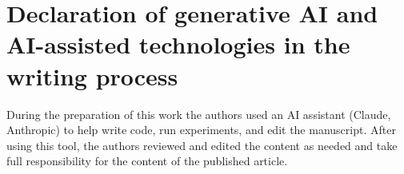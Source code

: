 \documentclass[preprint,12pt]{elsarticle}
\begin{document}
\section*{Declaration of generative AI and AI-assisted technologies in the writing process}
During the preparation of this work the authors used an AI assistant (Claude, Anthropic) to help write code, run experiments, and edit the manuscript. After using this tool, the authors reviewed and edited the content as needed and take full responsibility for the content of the published article.



\end{document}
